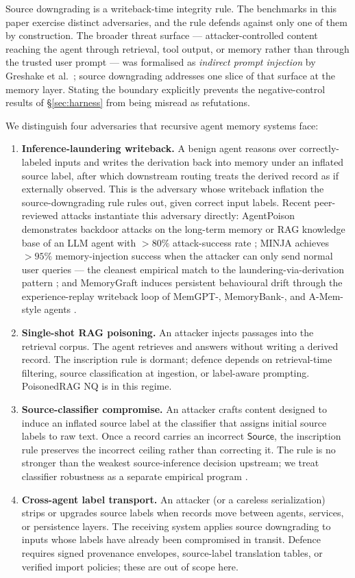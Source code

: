\documentclass[11pt]{article}
\newcommand{\Source}{\mathsf{Source}}
\begin{document}
Source downgrading is a writeback-time integrity rule. The benchmarks in this paper exercise distinct adversaries, and the rule defends against only one of them by construction. The broader threat surface --- attacker-controlled content reaching the agent through retrieval, tool output, or memory rather than through the trusted user prompt --- was formalised as \emph{indirect prompt injection} by Greshake et al.\ \cite{Greshake2023NotWhat}; source downgrading addresses one slice of that surface at the memory layer. Stating the boundary explicitly prevents the negative-control results of \S\ref{sec:harness} from being misread as refutations.

We distinguish four adversaries that recursive agent memory systems face:
\begin{enumerate}
\item \textbf{Inference-laundering writeback.} A benign agent reasons over correctly-labeled inputs and writes the derivation back into memory under an inflated source label, after which downstream routing treats the derived record as if externally observed. This is the adversary whose writeback inflation the source-downgrading rule rules out, given correct input labels. Recent peer-reviewed attacks instantiate this adversary directly: AgentPoison demonstrates backdoor attacks on the long-term memory or RAG knowledge base of an LLM agent with $>80\%$ attack-success rate \cite{Chen2024AgentPoison}; MINJA achieves $>95\%$ memory-injection success when the attacker can only send normal user queries --- the cleanest empirical match to the laundering-via-derivation pattern \cite{Dong2025MINJA}; and MemoryGraft induces persistent behavioural drift through the experience-replay writeback loop of MemGPT-, MemoryBank-, and A-Mem-style agents \cite{Srivastava2025MemoryGraft}.
\item \textbf{Single-shot RAG poisoning.} An attacker injects passages into the retrieval corpus. The agent retrieves and answers without writing a derived record. The inscription rule is dormant; defence depends on retrieval-time filtering, source classification at ingestion, or label-aware prompting. PoisonedRAG NQ is in this regime.
\item \textbf{Source-classifier compromise.} An attacker crafts content designed to induce an inflated source label at the classifier that assigns initial source labels to raw text. Once a record carries an incorrect $\Source$, the inscription rule preserves the incorrect ceiling rather than correcting it. The rule is no stronger than the weakest source-inference decision upstream; we treat classifier robustness as a separate empirical program \cite{Carboni2026SourceInf}.
\item \textbf{Cross-agent label transport.} An attacker (or a careless serialization) strips or upgrades source labels when records move between agents, services, or persistence layers. The receiving system applies source downgrading to inputs whose labels have already been compromised in transit. Defence requires signed provenance envelopes, source-label translation tables, or verified import policies; these are out of scope here.
\end{enumerate}
\end{document}
